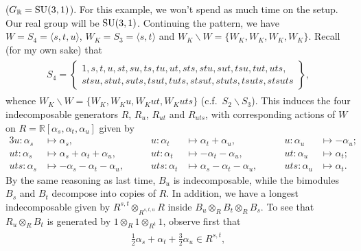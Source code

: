 \noindent\begin{example}\textup{($G_\mathbb{R} = \textup{SU}(3,1)$).} For this example, we won't spend as much time on the setup. Our real group will be $\textup{SU}(3,1)$. Continuing the pattern, we have $W = S_4 = \langle s, t, u \rangle$, $W_K = S_3 = \langle s, t\rangle$ and $W_K\backslash W = \{W_K, W_K, W_K, W_K\}$. Recall (for my own sake) that
\begin{align*}
\begin{split}
S_4 = \left\{\begin{matrix}1, s, t, u, st, su, ts, tu, ut, sts, stu, sut, tsu, tut, uts,\\ stsu, stut, suts, tsut, tuts, stsut, stuts, tsuts, stsuts\end{matrix}\right\},
\end{split}
\end{align*}
\noindent whence $W_K\backslash W = \{W_K, W_Ku, W_Kut, W_Kuts\}$ (c.f.\ $S_2\backslash S_3$). This induces the four indecomposable generators $R$, $R_u$, $R_{ut}$ and $R_{uts}$, with corresponding actions of $W$ on $R = \mathbb{R}[\alpha_s, \alpha_t, \alpha_u]$ given by
\begin{alignat*}{3}
u : \alpha_s &\mapsto \alpha_s, \qquad &u : \alpha_t &\mapsto \alpha_t + \alpha_u, \qquad &u : \alpha_u &\mapsto -\alpha_u;\\
ut : \alpha_s &\mapsto \alpha_s + \alpha_t + \alpha_u, \qquad &ut : \alpha_t &\mapsto -\alpha_t - \alpha_u, \qquad &ut : \alpha_u &\mapsto \alpha_t;\\
uts : \alpha_s &\mapsto -\alpha_s - \alpha_t - \alpha_u, \qquad &uts : \alpha_t &\mapsto \alpha_s - \alpha_t - \alpha_u, \qquad &uts : \alpha_u &\mapsto \alpha_t.
\end{alignat*}
\noindent By the same reasoning as last time, $B_u$ is indecomposable, while the bimodules $B_s$ and $B_t$ decompose into copies of $R$. In addition, we have a longest indecomposable given by $R^{s,t} \otimes_{R^{s,t,u}} R$ inside $B_u \otimes_R B_t \otimes_R B_s$. To see that $R_u \otimes_R B_t$ is generated by $1 \otimes_R 1 \otimes_{R^t} 1$, observe first that
\begin{align*}
\begin{split}
\frac{1}{2}\alpha_s + \alpha_t + \frac{3}{2}\alpha_u \in R^{s,t},
\end{split}
\end{align*}
\begin{align*}
\begin{split}

\end{split}
\end{align*}
\end{example}
